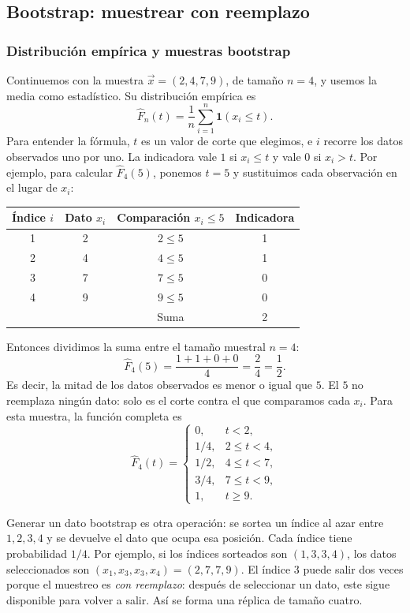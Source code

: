 \subsection{Bootstrap: muestrear con reemplazo}

\subsubsection{Distribución empírica y muestras bootstrap}

Continuemos con la muestra $\vec{x}=(2,4,7,9)$, de tamaño $n=4$, y usemos
la media como estadístico. Su distribución empírica es
\[
    \widehat F_n(t)=\frac{1}{n}\sum_{i=1}^{n}\mathbf 1(x_i\leq t).
\]
Para entender la fórmula, $t$ es un valor de corte que elegimos, e $i$ recorre
los datos observados uno por uno. La indicadora vale $1$ si $x_i\leq t$ y vale
$0$ si $x_i>t$. Por ejemplo, para calcular $\widehat F_4(5)$, ponemos $t=5$
y sustituimos cada observación en el lugar de $x_i$:
\begin{center}
\begin{tabular}{@{}cccc@{}}
    \toprule
    Índice $i$ & Dato $x_i$ & Comparación $x_i\leq5$ & Indicadora\\
    \midrule
    1 & 2 & $2\leq5$ & 1\\
    2 & 4 & $4\leq5$ & 1\\
    3 & 7 & $7\leq5$ & 0\\
    4 & 9 & $9\leq5$ & 0\\
    \midrule
    & & Suma & 2\\
    \bottomrule
\end{tabular}
\end{center}
Entonces dividimos la suma entre el tamaño muestral $n=4$:
\[
    \widehat F_4(5)=\frac{1+1+0+0}{4}=\frac{2}{4}=\frac{1}{2}.
\]
Es decir, la mitad de los datos observados es menor o igual que $5$. El $5$
no reemplaza ningún dato: solo es el corte contra el que comparamos cada
$x_i$. Para esta muestra, la función completa es
\[
    \widehat F_4(t)=
    \begin{cases}
        0, & t<2,\\
        1/4, & 2\leq t<4,\\
        1/2, & 4\leq t<7,\\
        3/4, & 7\leq t<9,\\
        1, & t\geq9.
    \end{cases}
\]

Generar un dato bootstrap es otra operación: se sortea un índice al azar entre
$1,2,3,4$ y se devuelve el dato que ocupa esa posición. Cada índice tiene
probabilidad $1/4$. Por ejemplo, si los índices sorteados son
$(1,3,3,4)$, los datos seleccionados son
$(x_1,x_3,x_3,x_4)=(2,7,7,9)$. El índice $3$ puede salir dos veces porque el
muestreo es \emph{con reemplazo}: después de seleccionar un dato, este sigue
disponible para volver a salir. Así se forma una réplica de tamaño cuatro.

